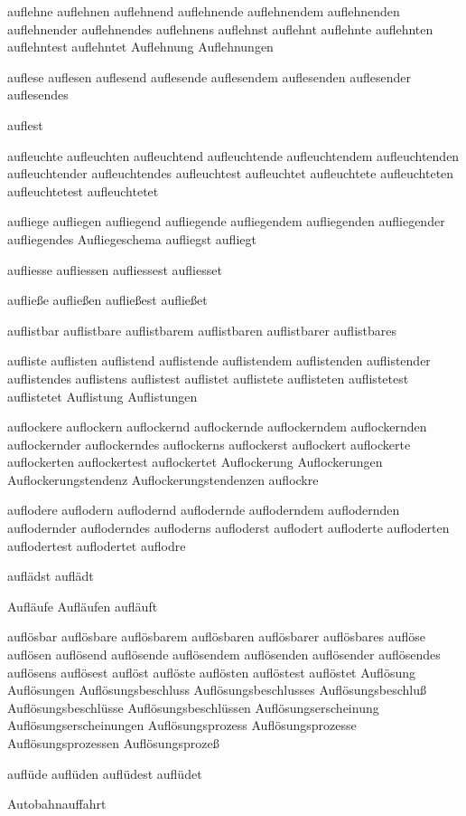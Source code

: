 auflehne auflehnen auflehnend auflehnende auflehnendem auflehnenden auflehnender auflehnendes auflehnens auflehnst auflehnt auflehnte auflehnten auflehntest auflehntet Auflehnung Auflehnungen

auflese auflesen auflesend auflesende auflesendem auflesenden auflesender auflesendes

auflest

aufleuchte aufleuchten aufleuchtend aufleuchtende aufleuchtendem aufleuchtenden aufleuchtender aufleuchtendes aufleuchtest aufleuchtet aufleuchtete aufleuchteten aufleuchtetest aufleuchtetet

aufliege aufliegen aufliegend aufliegende aufliegendem aufliegenden aufliegender aufliegendes Aufliegeschema aufliegst aufliegt

aufliesse aufliessen aufliessest aufliesset

aufließe aufließen aufließest aufließet

auflistbar auflistbare auflistbarem auflistbaren auflistbarer auflistbares 

aufliste auflisten auflistend auflistende auflistendem auflistenden auflistender auflistendes auflistens auflistest auflistet auflistete auflisteten auflistetest auflistetet Auflistung Auflistungen

auflockere auflockern auflockernd auflockernde auflockerndem auflockernden auflockernder auflockerndes auflockerns auflockerst auflockert auflockerte auflockerten auflockertest auflockertet Auflockerung Auflockerungen Auflockerungstendenz Auflockerungstendenzen auflockre

auflodere auflodern auflodernd auflodernde aufloderndem auflodernden auflodernder aufloderndes aufloderns aufloderst auflodert aufloderte aufloderten auflodertest auflodertet auflodre

auflädst auflädt

Aufläufe Aufläufen aufläuft

auflösbar auflösbare auflösbarem auflösbaren auflösbarer auflösbares auflöse auflösen auflösend auflösende auflösendem auflösenden auflösender auflösendes auflösens auflösest auflöst auflöste auflösten auflöstest auflöstet Auflösung Auflösungen Auflösungsbeschluss Auflösungsbeschlusses Auflösungsbeschluß Auflösungsbeschlüsse Auflösungsbeschlüssen Auflösungserscheinung Auflösungserscheinungen Auflösungsprozess Auflösungsprozesse Auflösungsprozessen Auflösungsprozeß

auflüde auflüden auflüdest auflüdet

Autobahnauffahrt

